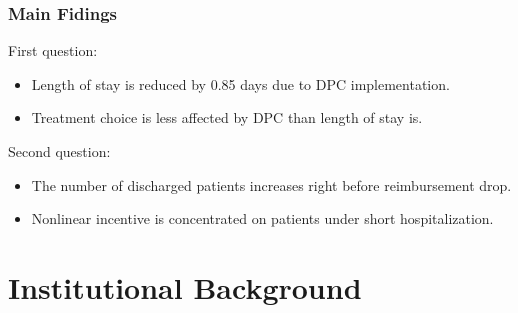 \documentclass[14pt]{beamer}
\begin{document}
\begin{frame}
\frametitle{Main Fidings}
First question:
\begin{itemize}
\item Length of stay is reduced by 0.85 days due to DPC implementation.
\item Treatment choice is less affected by DPC than length of stay is.
\end{itemize}
Second question:
\begin{itemize}
\item The number of discharged patients increases right before reimbursement drop.
\item Nonlinear incentive is concentrated on patients under short hospitalization.
\end{itemize}
\end{frame}

\section{Institutional Background}
\end{document}
